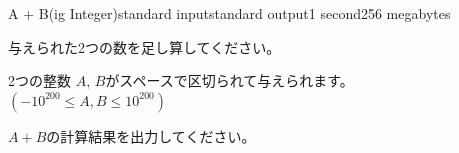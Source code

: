 \begin{problem}{A + B(ig Integer)}{standard input}{standard output}{1 second}{256 megabytes}

与えられた2つの数を足し算してください。

\InputFile
2つの整数 $A$, $B$がスペースで区切られて与えられます。 $(-10^{200} \le A, B \le 10^{200})$

\OutputFile
$A + B$の計算結果を出力してください。

\Example

\begin{example}
%
\end{example}

\end{problem}

